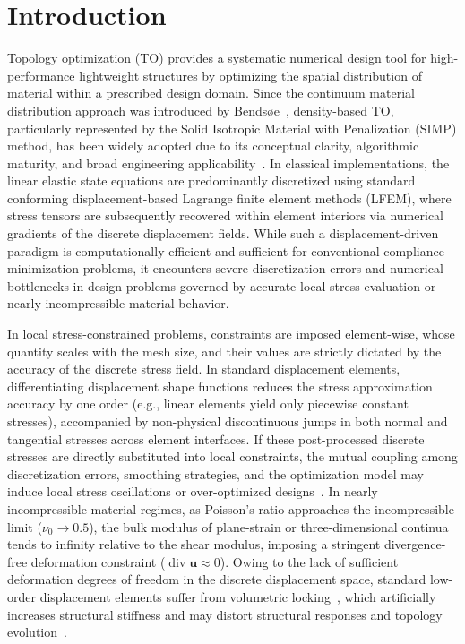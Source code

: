 \section{Introduction}
\label{sec:introduction}

Topology optimization (TO) provides a systematic numerical design tool for high-performance lightweight structures by optimizing the spatial distribution of material within a prescribed design domain. Since the continuum material distribution approach was introduced by Bends{\o}e~\cite{Bendsoe1989}, density-based TO, particularly represented by the Solid Isotropic Material with Penalization (SIMP) method, has been widely adopted due to its conceptual clarity, algorithmic maturity, and broad engineering applicability~\cite{BendsoeSigmund2004}. In classical implementations, the linear elastic state equations are predominantly discretized using standard conforming displacement-based Lagrange finite element methods (LFEM), where stress tensors are subsequently recovered within element interiors via numerical gradients of the discrete displacement fields. While such a displacement-driven paradigm is computationally efficient and sufficient for conventional compliance minimization problems, it encounters severe discretization errors and numerical bottlenecks in design problems governed by accurate local stress evaluation or nearly incompressible material behavior.

In local stress-constrained problems, constraints are imposed element-wise, whose quantity scales with the mesh size, and their values are strictly dictated by the accuracy of the discrete stress field. In standard displacement elements, differentiating displacement shape functions reduces the stress approximation accuracy by one order (e.g., linear elements yield only piecewise constant stresses), accompanied by non-physical discontinuous jumps in both normal and tangential stresses across element interfaces. If these post-processed discrete stresses are directly substituted into local constraints, the mutual coupling among discretization errors, smoothing strategies, and the optimization model may induce local stress oscillations or over-optimized designs~\cite{Duysinx1998,Le2010,Paris2009,Senhora2020}. In nearly incompressible material regimes, as Poisson's ratio approaches the incompressible limit ($\nu_0 \to 0.5$), the bulk modulus of plane-strain or three-dimensional continua tends to infinity relative to the shear modulus, imposing a stringent divergence-free deformation constraint ($\operatorname{div}\boldsymbol{u} \approx 0$). Owing to the lack of sufficient deformation degrees of freedom in the discrete displacement space, standard low-order displacement elements suffer from volumetric locking~\cite{BabuskaSuri1992}, which artificially increases structural stiffness and may distort structural responses and topology evolution~\cite{Bruggi2016}.

